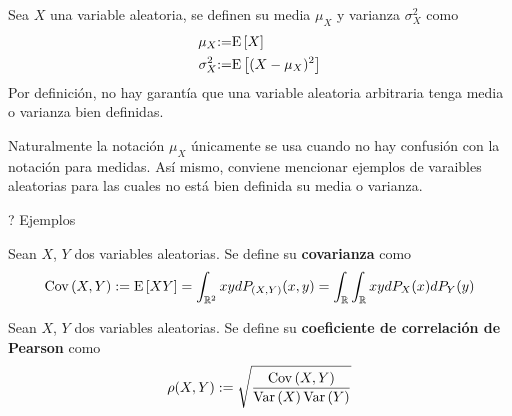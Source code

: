 \begin{definicion}
Sea $X$ una variable aleatoria, se definen su media $\mu_X$ y varianza $\sigma_X^{2}$ como
\begin{align}
\mu_X &{:=} \mathrm{E}\left[ X \right] \\
\sigma_X^{2} &{:=} \mathrm{E}\left[ (X-\mu_X)^{2} \right]
\end{align}
Por definición, no hay garantía que una variable aleatoria arbitraria tenga media o varianza bien definidas.
\end{definicion}

Naturalmente la notación $\mu_X$ únicamente se usa cuando no hay confusión con la notación para medidas. Así mismo, conviene mencionar ejemplos de varaibles aleatorias para las cuales no está bien definida su media o varianza.

? Ejemplos



\begin{definicion}
Sean $X$, $Y$ dos variables aleatorias. Se define su \textbf{covarianza} como
\begin{equation}
\mathrm{Cov}\left( X,Y \right) := \mathrm{E}\left[ X Y \right] = \int_{\mathbb{R}^{2}} x y d P_{(X,Y)}(x,y) = \int_{\mathbb{R}} \int_{\mathbb{R}} x y dP_X(x) dP_Y(y)
\end{equation}
\end{definicion}


\begin{definicion}
Sean $X$, $Y$ dos variables aleatorias. Se define su \textbf{coeficiente de correlación de Pearson} como
\begin{equation}
\rho (X,Y) := \sqrt{\frac{\mathrm{Cov}\left( X,Y \right)}{\mathrm{Var}\left( X \right) \mathrm{Var}\left( Y \right)}}
\end{equation}
\end{definicion}

